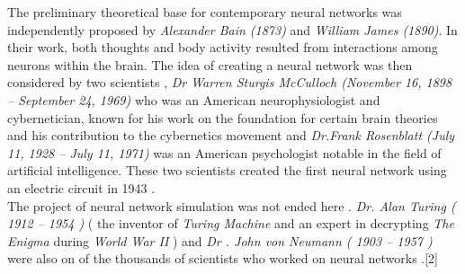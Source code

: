 \documentclass[12pt , a4paper]{article}
\begin{document}
The preliminary theoretical base for contemporary neural networks was independently proposed by  \textit{Alexander Bain (1873)}   and  \textit{William James (1890)}.  In their work, both thoughts and body activity resulted from interactions among neurons within the brain.
The idea of creating a neural network was then considered by two scientists , \textit{Dr Warren Sturgis McCulloch (November 16, 1898 – September 24, 1969)}  who was an American neurophysiologist and cybernetician, known for his work on the foundation for certain brain theories and his contribution to the cybernetics movement and  \textit{Dr.Frank Rosenblatt (July 11, 1928 – July 11, 1971) }  was an American psychologist notable in the field of artificial intelligence. These two scientists created the first neural network using an electric circuit in 1943 . \\
The project of neural network simulation was not ended here . \textit{Dr. Alan Turing ( 1912 – 1954 )} ( the inventor of  \textit{Turing Machine }  and an expert in decrypting  \textit{The Enigma} during \textit{World War II} )  and \textit{Dr . John von Neumann ( 1903 – 1957 )}   were also on of the thousands of scientists who worked on neural networks .[2]
\end{document}
